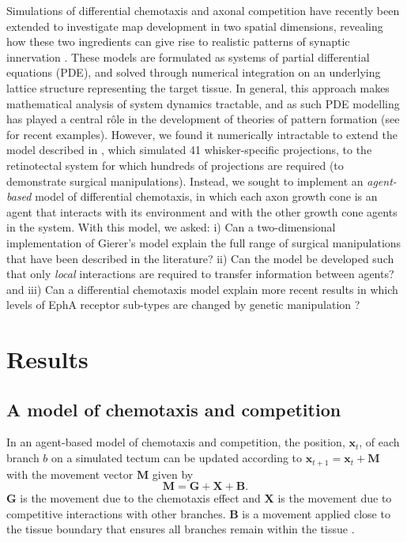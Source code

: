 \documentclass[11pt, a4paper]{article}
\begin{document}
Simulations of differential chemotaxis and axonal competition have recently been extended to investigate map development in two spatial dimensions, revealing how these two ingredients can give rise to realistic patterns of synaptic innervation \citep{james_modelling_2020}. 
These models are formulated as systems of partial differential equations (PDE), and solved through numerical integration on an underlying lattice structure representing the target tissue. 
In general, this approach makes mathematical analysis of system dynamics tractable, and as such PDE modelling has played a central r\^ole in the development of theories of pattern formation (see \citet{krause_modern_2021} for recent examples). 
However, we found it numerically intractable to extend the model described in \citet{james_modelling_2020}, which simulated 41 whisker-specific projections, to the retinotectal system for which hundreds of projections are required (to demonstrate surgical manipulations).
Instead, we sought to implement an \emph{agent-based} model of differential chemotaxis, in which each axon growth cone is an agent that interacts with its environment and with the other growth cone agents in the system.
With this model, we asked: i) Can a two-dimensional implementation of Gierer's model explain the full range of surgical manipulations that have been described in the literature? ii) Can the model be developed such that only \emph{local} interactions are required to transfer information between agents? and iii) Can a differential chemotaxis model explain more recent results in which levels of EphA receptor sub-types are changed by genetic manipulation \citep{brown_topographic_2000,reber_relative_2004}?

\section{Results}
\subsection*{A model of chemotaxis and competition}

In an agent-based model of chemotaxis and competition, the position, $\mathbf{x}_t$, of each branch $b$ on a simulated tectum can be updated according to $\mathbf{x}_{t+1} = \mathbf{x}_{t} + \mathbf{M}$ with the movement vector $\mathbf{M}$ given by
\begin{equation} \label{e:M}
 \mathbf{M} = \mathbf{G} +  \mathbf{X} + \mathbf{B}.
\end{equation}
$\mathbf{G}$ is the movement due to the chemotaxis effect and $\mathbf{X}$ is the movement due to competitive interactions with other branches. 
$\mathbf{B}$ is a movement applied close to the tissue boundary that ensures all branches remain within the tissue \citep{holt_target_1998}.
\end{document}
